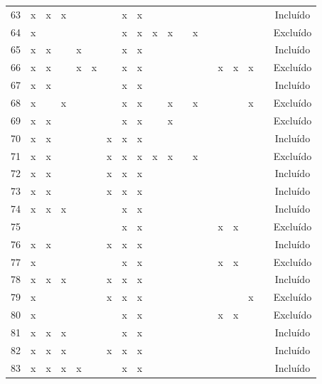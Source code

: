\documentclass[
	12pt,				%
	oneside,			%
	a4paper,			%
	english,			%
	brazil				%
	]{abntex2ppgsi}
\begin{document}
\begin{apendicesenv}
\begin{table}[H]
\begin{tabular}{c | c c c c c c c c | c c c c c c c c c | c}
63 & x & x & x &   &   &   & x & x &   &   &   &   &   &   &   &   &   & Incluído \\
64 & x &   &   &   &   &   & x & x & x & x &   & x &   &   &   &   &   & Excluído \\
65 & x & x &   & x &   &   & x & x &   &   &   &   &   &   &   &   &   & Incluído \\
66 & x & x &   & x & x &   & x & x &   &   &   &   &   & x & x & x &   & Excluído \\
67 & x & x &   &   &   &   & x & x &   &   &   &   &   &   &   &   &   & Incluído \\
68 & x &   & x &   &   &   & x & x &   & x &   & x &   &   &   & x &   & Excluído \\
69 & x & x &   &   &   &   & x & x &   & x &   &   &   &   &   &   &   & Excluído \\
70 & x & x &   &   &   & x & x & x &   &   &   &   &   &   &   &   &   & Incluído \\
71 & x & x &   &   &   & x & x & x & x & x &   & x &   &   &   &   &   & Excluído \\
72 & x & x &   &   &   & x & x & x &   &   &   &   &   &   &   &   &   & Incluído \\
73 & x & x &   &   &   & x & x & x &   &   &   &   &   &   &   &   &   & Incluído \\
74 & x & x & x &   &   &   & x & x &   &   &   &   &   &   &   &   &   & Incluído \\
75 &   &   &   &   &   &   & x & x &   &   &   &   &   & x & x &   &   & Excluído \\
76 & x & x &   &   &   & x & x & x &   &   &   &   &   &   &   &   &   & Incluído \\
77 & x &   &   &   &   &   & x & x &   &   &   &   &   & x & x &   &   & Excluído \\
78 & x & x & x &   &   & x & x & x &   &   &   &   &   &   &   &   &   & Incluído \\
79 & x &   &   &   &   & x & x & x &   &   &   &   &   &   &   & x &   & Excluído \\
80 & x &   &   &   &   &   & x & x &   &   &   &   &   & x & x &   &   & Excluído \\
81 & x & x & x &   &   &   & x & x &   &   &   &   &   &   &   &   &   & Incluído \\
82 & x & x & x &   &   & x & x & x &   &   &   &   &   &   &   &   &   & Incluído \\
83 & x & x & x & x &   &   & x & x &   &   &   &   &   &   &   &   &   & Incluído \\

\end{tabular}
\end{table}
\end{apendicesenv}
\end{document}
